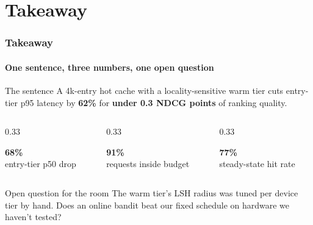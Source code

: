 \setcounter{secprog}{5}
\section{Takeaway}

\begin{frame}
  \frametitle{Takeaway}
  \framesubtitle{One sentence, three numbers, one open question}
  \begin{alertblock}{The sentence}
    A 4k-entry hot cache with a locality-sensitive warm tier cuts entry-tier p95 latency by \textbf{62\%} for \textbf{under 0.3 NDCG points} of ranking quality.
  \end{alertblock}
  \vspace{2mm}
  \begin{columns}[T]
    \begin{column}{0.33\textwidth}
      \begin{tcolorbox}[colback=mist,colframe=signalteal,arc=2mm,boxrule=0.6pt,valign=center,halign=center]
        {\Large\bfseries\color{signalteal}68\%}\\[2pt]
        {\scriptsize entry-tier p50 drop}
      \end{tcolorbox}
    \end{column}
    \begin{column}{0.33\textwidth}
      \begin{tcolorbox}[colback=mist,colframe=signalteal,arc=2mm,boxrule=0.6pt,valign=center,halign=center]
        {\Large\bfseries\color{signalteal}91\%}\\[2pt]
        {\scriptsize requests inside budget}
      \end{tcolorbox}
    \end{column}
    \begin{column}{0.33\textwidth}
      \begin{tcolorbox}[colback=mist,colframe=signalteal,arc=2mm,boxrule=0.6pt,valign=center,halign=center]
        {\Large\bfseries\color{signalteal}77\%}\\[2pt]
        {\scriptsize steady-state hit rate}
      \end{tcolorbox}
    \end{column}
  \end{columns}
  \vspace{3mm}
  \begin{block}{Open question for the room}
    \small The warm tier's LSH radius was tuned per device tier by hand. Does an online bandit beat our fixed schedule on hardware we haven't tested?
  \end{block}
\end{frame}

